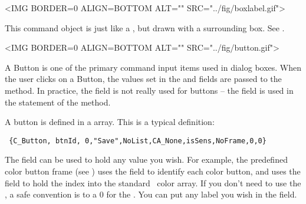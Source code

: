 
\small
\begin{rawhtml}
<IMG BORDER=0 ALIGN=BOTTOM ALT="" SRC="../fig/boxlabel.gif">
\end{rawhtml}
\begin{latexonly}

\end{latexonly}
\normalfont\normalsize
\vspace{.1in}

This command object is just like a , but drawn
with a surrounding box. See .


\small
\begin{rawhtml}
<IMG BORDER=0 ALIGN=BOTTOM ALT="" SRC="../fig/button.gif">
\end{rawhtml}
\begin{latexonly}

\end{latexonly}
\normalfont\normalsize
\vspace{.1in}

A Button is one of the primary command input items used in dialog
boxes. When the user clicks on a Button, the values set in the
 and  fields are passed to the 
method. In practice, the  field is not really used
for buttons -- the  field is used in the
 statement of the  method.

A button is defined in a  array. This is a
typical definition:

\footnotesize
\begin{verbatim}
 {C_Button, btnId, 0,"Save",NoList,CA_None,isSens,NoFrame,0,0}
\end{verbatim}
\normalfont\normalsize

The  field can be used to hold any value you wish.
For example, the predefined color button frame (see )
uses the  field to identify each color button, and
uses the  field to hold the index into the standard
\V\ color array. If you don't need to use the ,
a safe convention is to a 0 for
the . You can put any label you
wish in the  field.

